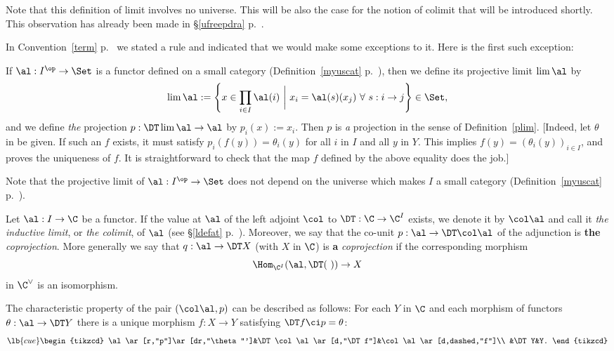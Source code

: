 \documentclass[12pt]{article}
\theoremstyle{remark}
\theoremstyle{definition}
\begin{document}
\begin{rk}
Note that this definition of limit involves no universe. This will be also the case for the notion of colimit that will be introduced shortly. This observation has already been made in \S\ref{ufreepdra} p.~.
\end{rk}

%

In Convention~\ref{term} p.~ we stated a rule and indicated that we would make some exceptions to it. Here is the first such exception:

\begin{conv} 
If $\al:I^{\op}\to\Set$ is a functor defined on a small category (Definition~\ref{myuscat} p.~), then we define its projective limit $\lim\al$ by 
$$ 
\lim\al:=\left\{x\in\prod_{i\in I}\al(i)\ \bigg|\ x_i=\al(s)(x_j)\ \forall\ s:i\to j\right\}\in\Set,
$$ 
and we define \emph{the} projection $p:\DT\lim\al\to\al$ by $p_i(x):=x_i$. Then $p$ is \emph{a} projection in the sense of Definition~\ref{plim}. [Indeed, let $\theta$ in  be given. If such an $f$ exists, it must satisfy $p_i(f(y))=\theta_i(y)$ for all $i$ in $I$ and all $y$ in $Y$. This implies $f(y)=(\theta_i(y))_{i\in I}$, and proves the uniqueness of $f$. It is straightforward to check that the map $f$ defined by the above equality does the job.]
\end{conv}

Note that the projective limit of $\al:I^{\op}\to\Set$ does not depend on the universe which makes $I$ a small category (Definition~\ref{myuscat} p.~).

\begin{df} 
Let $\al:I\to\C$ be a functor. If the value at $\al$ of the left adjoint $\col$ to $\DT:\C\to\C^I$ exists, we denote it by $\col\al$ and call it {\em the inductive limit}, or {\em the colimit}, of $\al$ (see \S\ref{ldefat} p.~). Moreover, we say that the co-unit $p:\al\to\DT\col\al$ of the adjunction is \textbf{the} \emph{coprojection}. More generally we say that $q:\al\to\DT X$ (with $X$ in $\C$) is \textbf{a} \emph{coprojection} if the corresponding morphism 
$$
\Hom_{\C^I}(\al,\DT(\ ))\to X
$$ 
in $\C^\vee$ is an isomorphism.
\end{df}

The characteristic property of the pair $(\col\al,p)$ can be described as follows: For each $Y$ in $\C$ and each morphism of functors $\theta:\al\to\DT Y$ there is a unique morphism $f:X\to Y$ satisfying $\DT f\ci p=\theta$: 
\begin{equation}\lb{cue}
\begin{tikzcd}
\al\ar[r,"p"]\ar[dr,"\theta"']&\DT\col\al\ar[d,"\DT f"]&\col\al\ar[d,dashed,"f"]\\ 
&\DT Y&Y.
\end{tikzcd}
\end{equation}
\end{document}
